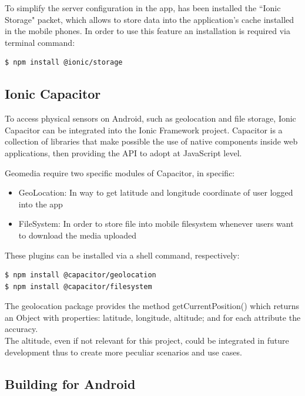 \documentclass[conference]{IEEEtran}
\begin{document}
To simplify the server configuration in the app, has been installed the ``Ionic Storage" \cite{b9} packet, which allows to store data into the application's cache installed in the mobile phones. In order to use this feature an installation is required via terminal command: 
\begin{lstlisting}[language=Sh]
$ npm install @ionic/storage
\end{lstlisting}



\subsection{Ionic Capacitor}

To access physical sensors on Android, such as geolocation and file storage, Ionic Capacitor\cite{b10} can be integrated into the Ionic Framework project. Capacitor is a collection of libraries that make possible the use of native components inside web applications, then providing the API to adopt at JavaScript level.

Geomedia require two specific modules of Capacitor, in specific:
\begin{itemize}
    \item GeoLocation\cite{b2}: In way to get latitude and longitude coordinate of user logged into the app
    \item FileSystem\cite{b3}: In order to store file into mobile filesystem whenever users want to download the media uploaded
\end{itemize}

These plugins can be installed via a shell command, respectively:
\begin{lstlisting}[language=Sh]
$ npm install @capacitor/geolocation
$ npm install @capacitor/filesystem
\end{lstlisting}

The geolocation package provides the method getCurrentPosition() which returns an Object with properties: latitude, longitude, altitude; and for each attribute the accuracy.
\\
The altitude, even if not relevant for this project, could be integrated in future development thus to create more peculiar scenarios and use cases.


\subsection{Building for Android}
\end{document}
